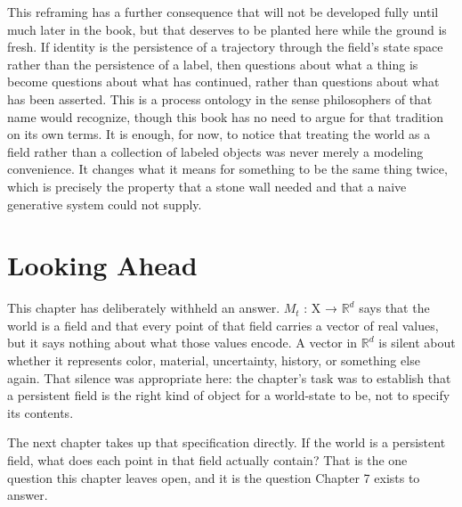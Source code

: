 This reframing has a further consequence that will not be developed fully until much later in the book, but that deserves to be planted here while the ground is fresh. If identity is the persistence of a trajectory through the field's state space rather than the persistence of a label, then questions about what a thing is become questions about what has continued, rather than questions about what has been asserted. This is a process ontology in the sense philosophers of that name would recognize, though this book has no need to argue for that tradition on its own terms. It is enough, for now, to notice that treating the world as a field rather than a collection of labeled objects was never merely a modeling convenience. It changes what it means for something to be the same thing twice, which is precisely the property that a stone wall needed and that a naive generative system could not supply.

\section{Looking Ahead}

This chapter has deliberately withheld an answer. \(M_t\) : X → \(\mathbb{R}^d\) says that the world is a field and that every point of that field carries a vector of real values, but it says nothing about what those values encode. A vector in \(\mathbb{R}^d\) is silent about whether it represents color, material, uncertainty, history, or something else again. That silence was appropriate here: the chapter's task was to establish that a persistent field is the right kind of object for a world-state to be, not to specify its contents.

The next chapter takes up that specification directly. If the world is a persistent field, what does each point in that field actually contain? That is the one question this chapter leaves open, and it is the question Chapter 7 exists to answer.

